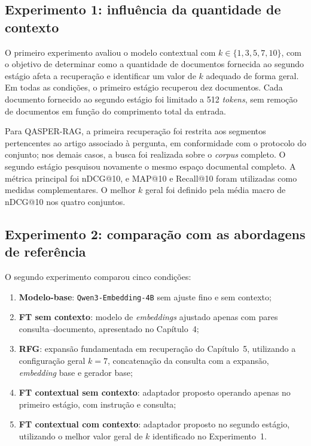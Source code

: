 \subsection{Experimento 1: influência da quantidade de contexto}

O primeiro experimento avaliou o modelo contextual com $k\in\{1,3,5,7,10\}$, com o objetivo de determinar como a quantidade de documentos fornecida ao segundo estágio afeta a recuperação e identificar um valor de $k$ adequado de forma geral. Em todas as condições, o primeiro estágio recuperou dez documentos. Cada documento fornecido ao segundo estágio foi limitado a 512 \textit{tokens}, sem remoção de documentos em função do comprimento total da entrada.

Para QASPER-RAG, a primeira recuperação foi restrita aos segmentos pertencentes ao artigo associado à pergunta, em conformidade com o protocolo do conjunto; nos demais casos, a busca foi realizada sobre o \textit{corpus} completo. O segundo estágio pesquisou novamente o mesmo espaço documental completo. A métrica principal foi nDCG@10, e MAP@10 e Recall@10 foram utilizadas como medidas complementares. O melhor $k$ geral foi definido pela média macro de nDCG@10 nos quatro conjuntos.

\subsection{Experimento 2: comparação com as abordagens de referência}

O segundo experimento comparou cinco condições:
\begin{enumerate}
    \item \textbf{Modelo-base}: \texttt{Qwen3-Embedding-4B} sem ajuste fino e sem contexto;
    \item \textbf{FT sem contexto}: modelo de \textit{embeddings} ajustado apenas com pares consulta--documento, apresentado no Capítulo~4;
    \item \textbf{RFG}: expansão fundamentada em recuperação do Capítulo~5, utilizando a configuração geral $k=7$, concatenação da consulta com a expansão, \textit{embedding} base e gerador base;
    \item \textbf{FT contextual sem contexto}: adaptador proposto operando apenas no primeiro estágio, com instrução e consulta;
    \item \textbf{FT contextual com contexto}: adaptador proposto no segundo estágio, utilizando o melhor valor geral de $k$ identificado no Experimento~1.
\end{enumerate}

